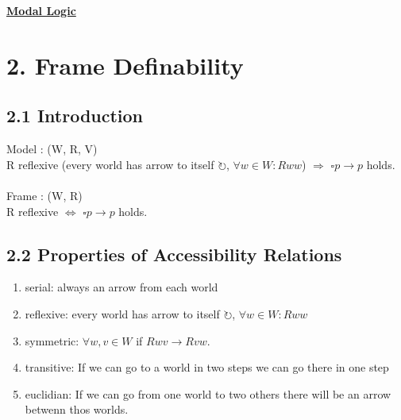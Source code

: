 \documentclass{report}
\begin{document}
\begin{center}
\huge{\textbf{\underline{Modal Logic}}}
\end{center}
 
{\let\clearpage\relax \chapter*{2. Frame Definability}}
\section*{2.1 Introduction}
Model : (W, R, V) \\
R reflexive (every world has arrow to itself $\circlearrowright$, $\forall w \in W: Rww$) $\Rightarrow$ $\square p \rightarrow p$ holds. \\ \\
Frame : (W, R) \\
R reflexive $\Leftrightarrow$ $\square p \rightarrow p$ holds.
\section*{2.2 Properties of Accessibility Relations}
\begin{enumerate}[]
	\item serial: always an arrow from each world
	\item reflexive: every world has arrow to itself $\circlearrowright$, $\forall w \in W: Rww$
	\item symmetric: $\forall w,v \in W$ if $Rwv \rightarrow Rvw$.
	\item transitive: If we can go to a world in two steps we can go there in one step
	\item euclidian: If we can go from one world to two others there will be an arrow betwenn thos worlds.
\end{enumerate}
\end{document}
